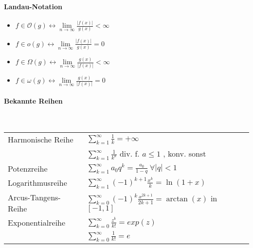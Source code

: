 \documentclass[paper=a3,paper=landscape, fontsize=9pt, DIV=30]{scrartcl}
\newcommand{\laO}{\mathcal{O}}
\begin{document}
\begin{multicols*}{4}
		\paragraph{Landau-Notation}
		\begin{itemize}
			\item $f \in \laO(g) \leftrightarrow \lim\limits_{n \rightarrow \infty} \frac{\lvert f(x) \rvert}{g(x)} < \infty$
			\item $f \in o(g) \leftrightarrow \lim\limits_{n \rightarrow \infty} \frac{\lvert f(x) \rvert}{g(x)} = 0$
			\item $f \in \Omega(g) \leftrightarrow \lim\limits_{n \rightarrow \infty} \frac{g(x)}{\lvert f(x) \rvert} < \infty$
			\item $f \in \omega(g) \leftrightarrow \lim\limits_{n \rightarrow \infty} \frac{g(x)}{\lvert f(x) \rvert} = 0$
		\end{itemize}
		

        \paragraph{Bekannte Reihen}\hspace{0pt}\\
        \begin{tabular}{ll}
	        Harmonische Reihe &  $\sum_{k=1}^{\infty}\frac{1}{k}=+\infty$\\
	        & $\sum_{k=1}^{\infty}\frac{1}{k^a}$ div. f. $a \leq 1 $ , konv. sonst \vspace{2pt}\\
	        Potenzreihe & $\sum_{k=1}^{\infty}a_0q^k=\frac{a_0}{1-q} \ \forall |q| < 1$\\\vspace{2pt}
	        Logarithmusreihe & $\sum_{k=1}^{\infty}(-1)^{k+1}\frac{x^k}{k} = \ln(1+x)$\\\vspace{2pt}
	        Arcus-Tangens-Reihe & $\sum_{k=0}^{\infty}(-1)^k\frac{x^{2k+1}}{2k+1} = \arctan(x)$ in $[-1,1]$\\\vspace{2pt}
	        Exponentialreihe & $\sum_{k=0}^{\infty} \frac{z^k}{k!} = exp(z)$\\
	        & $\sum_{k=0}^{\infty} \frac{1}{k!} = e$
        \end{tabular}


\end{multicols*}
\end{document}
